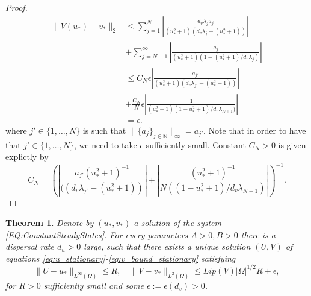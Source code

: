 \documentclass[12pt, a4paper]{article}
\theoremstyle{break}
\newtheorem{thm}{Theorem}[section]
\theoremstyle{break}
\theoremstyle{break}
\theoremstyle{break}
\theoremstyle{break}
\theoremstyle{break}
\theoremstyle{break}
\begin{document}
\begin{proof}
    \begin{align*}
        \|V(u_*) - v_*\|_2
        &\leq
        \sum_{j=1}^N\left| \frac{d_v \lambda_j a_j}{(u_*^2+1)(d_v\lambda_j - (u_*^2+1))} \right| \\
        &+
        \sum_{j=N+1}^\infty\left| \frac{a_j}{(u_*^2+1)(1 - (u_*^2+1) / d_v \lambda_j)} \right| \\
        &\leq
        C_N \epsilon \left| \frac{a_{j'}}{(u_*^2+1)(d_v\lambda_{j'} - (u_*^2+1))} \right| \\
        &+
        \frac{C_N}{N} \epsilon \left| \frac{1}{(u_*^2+1)(1 - u_*^2+1) / d_v \lambda_{N+1})} \right| \\
        &= \epsilon.
    \end{align*}
    where $j' \in \{1, \ldots, N\}$ is such that $\|\{a_j\}_{j \in \mathbb{N}}\|_\infty = a_{j'}$. Note that in order to have that $j' \in \{1, \ldots, N\}$, we need to take $\epsilon$ sufficiently small. Constant $C_N > 0$ is given explictly by
    \begin{equation*}
        C_N = \left( \left| \frac{a_{j'}(u_*^2+1)^{-1}}{((d_v\lambda_{j'} - (u_*^2+1))} \right| + \left| \frac{(u_*^2+1)^{-1}}{N((1 - u_*^2+1) / d_v \lambda_{N+1})} \right| \right)^{-1}.
    \end{equation*}
\end{proof}

\begin{thm}
    \label{thm:Stationary-Solutions-Existence}
    Denote by $(u_*, v_*)$ a solution of the system \eqref{EQ:ConstantSteadyStates}. For every parameters $A > 0, B > 0$ there is a dispersal rate $d_u >0$ large, such that there exists a unique solution $(U, V)$ of equations \eqref{eq:u_stationary}-\eqref{eq:v_bound_stationary} satisfying
    \begin{equation}
        \|U - u_*\|_{L^\infty(\Omega)} \leq R, \quad \|V - v_*\|_{L^2(\Omega)} \leq Lip(V) |\Omega|^{1/2} R + \epsilon,
    \end{equation}
    for $R > 0$ sufficiently small and some $\epsilon := \epsilon(d_v) > 0$.
\end{thm}
\end{document}
